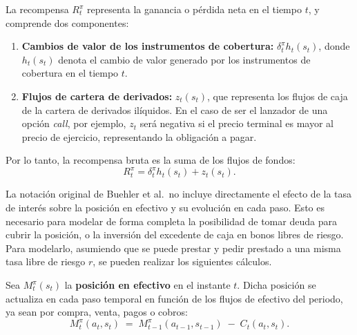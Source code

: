 \documentclass[11pt,a4paper,spanish]{article}
\numberwithin{equation}{section} %
\begin{document}
La recompensa \( R_t^\pi \) representa la ganancia o pérdida neta en el tiempo \( t \), y comprende dos componentes:
\begin{enumerate}
    \item \textbf{Cambios de valor de los instrumentos de cobertura:} \( \delta_t^\pi h_t(s_t) \), donde \( h_t(s_t) \) denota el cambio de valor generado por los instrumentos de cobertura en el tiempo \( t \).
    \item \textbf{Flujos de cartera de derivados:} \( z_t(s_t) \), que representa los flujos de caja de la cartera de derivados ilíquidos. En el caso de ser el lanzador de una opción \textit{call}, por ejemplo, \(z_t\) será negativa si el precio terminal es mayor al precio de ejercicio, representando la obligación a pagar.
\end{enumerate}

Por lo tanto, la recompensa bruta es la suma de los flujos de fondos:
\begin{equation}
R_t^\pi = \delta_t^\pi h_t(s_t) + z_t(s_t).
\end{equation}

La notación original de Buehler et al.\ no incluye directamente el efecto de la tasa de interés sobre la posición en efectivo y su evolución en cada paso. Esto es necesario para modelar de forma completa la posibilidad de tomar deuda para cubrir la posición, o la inversión del excedente de caja en bonos libres de riesgo. Para modelarlo, asumiendo que se puede prestar y pedir prestado a una misma tasa libre de riesgo \(r\), se pueden realizar los siguientes cálculos.

Sea \(M_t^\pi(s_t)\) la \textbf{posición en efectivo} en el instante \(t\). Dicha posición 
se actualiza en cada paso temporal en función de los flujos de efectivo del periodo, ya sean por compra, venta, pagos o cobros:
\begin{equation}
M_t^\pi(a_t, s_t) \;=\; M_{t-1}^\pi(a_{t-1}, s_{t-1}) \;-\; C_t(a_{t}, s_{t}).
\end{equation}
\end{document}
